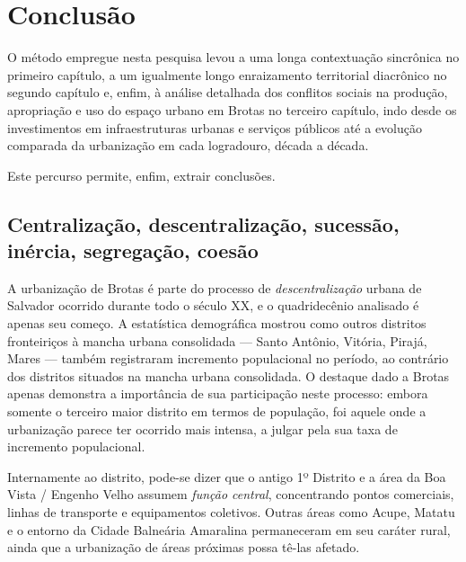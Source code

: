 \chapter*[Conclusão]{Conclusão}\label{concl}


O método empregue nesta pesquisa levou a uma longa contextuação sincrônica no primeiro capítulo, a um igualmente longo enraizamento territorial diacrônico no segundo capítulo e, enfim, à análise detalhada dos conflitos sociais na produção, apropriação e uso do espaço urbano em Brotas no terceiro capítulo, indo desde os investimentos em infraestruturas urbanas e serviços públicos até a evolução comparada da urbanização em cada logradouro, década a década.

Este percurso permite, enfim, extrair conclusões.

\section{Centralização, descentralização, sucessão, inércia, segregação, coesão}\label{subsec:3.3.1}

A urbanização de Brotas é parte do processo de \textit{descentralização} urbana de Salvador ocorrido durante todo o século XX, e o quadridecênio analisado é apenas seu começo. A estatística demográfica mostrou como outros distritos fronteiriços à mancha urbana consolidada --- Santo Antônio, Vitória, Pirajá, Mares --- também registraram incremento populacional no período, ao contrário dos distritos situados na mancha urbana consolidada. O destaque dado a Brotas apenas demonstra a importância de sua participação neste processo: embora somente o terceiro maior distrito em termos de população, foi aquele onde a urbanização parece ter ocorrido mais intensa, a julgar pela sua taxa de incremento populacional.

Internamente ao distrito, pode-se dizer que o antigo 1º Distrito e a área da Boa Vista / Engenho Velho assumem \textit{função central}, concentrando pontos comerciais, linhas de transporte e equipamentos coletivos. Outras áreas como Acupe, Matatu e o entorno da Cidade Balneária Amaralina permaneceram em seu caráter rural, ainda que a urbanização de áreas próximas possa tê-las afetado. 

